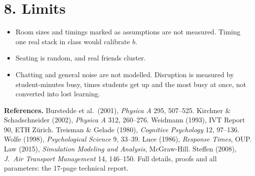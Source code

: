 \documentclass[10.5pt,a4paper]{article}
\begin{document}
\section*{8. Limits}
\begin{itemize}
\item Room sizes and timings marked as assumptions are not measured. Timing one real stack in class would calibrate $b$.
\item Seating is random, and real friends cluster.
\item Chatting and general noise are not modelled. Disruption is measured by student-minutes busy, times students get up and the most busy at once, not converted into lost learning.
\end{itemize}

{\small\textbf{References.}
Burstedde et al.\ (2001), \emph{Physica A} 295, 507--525.
Kirchner \& Schadschneider (2002), \emph{Physica A} 312, 260--276.
Weidmann (1993), IVT Report 90, ETH Z\"urich.
Treisman \& Gelade (1980), \emph{Cognitive Psychology} 12, 97--136.
Wolfe (1998), \emph{Psychological Science} 9, 33--39.
Luce (1986), \emph{Response Times}, OUP.
Law (2015), \emph{Simulation Modeling and Analysis}, McGraw-Hill.
Steffen (2008), \emph{J.\ Air Transport Management} 14, 146--150.
Full details, proofs and all parameters: the 17-page technical report.}
\end{document}
